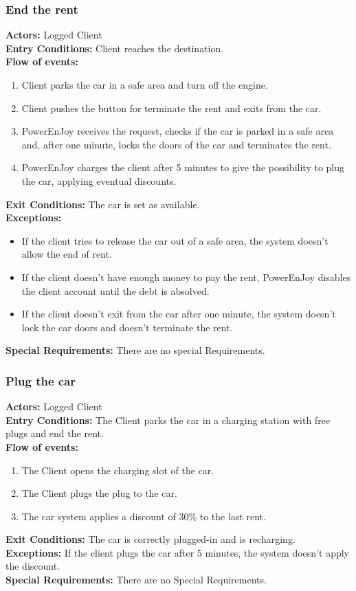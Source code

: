 \subsubsection{End the rent}
%
\textbf{Actors:}
Logged Client \\
%
\textbf{Entry Conditions:}
Client reaches the destination. \\
%
\textbf{Flow of events:}
\begin{enumerate}
\item Client parks the car in a safe area and turn off the engine.
\item Client pushes the button for terminate the rent and exits from the car.
\item PowerEnJoy receives the request, checks if the car is parked in a safe area and, after one minute, locks the doors of the car and terminates the rent.
\item PowerEnJoy charges the client after 5 minutes to give the possibility to plug the car, applying eventual discounts.
\end{enumerate}
%
\textbf{Exit Conditions:}
The car is set as available. \\
%
\textbf{Exceptions:}
\begin{itemize}
\item If the client tries to release the car out of a safe area, the system doesn't allow the end of rent.
\item If the client doesn't have enough money to pay the rent, PowerEnJoy disables the client account until the debt is absolved.
\item If the client doesn't exit from the car after one minute, the system doesn't lock the car doors and doesn't terminate the rent.
\end{itemize}
%
\textbf{Special Requirements:}
There are no special Requirements.



\subsubsection{Plug the car}
%
\textbf{Actors:}
Logged Client \\
%
\textbf{Entry Conditions:}
The Client parks the car in a charging station with free plugs and end the rent. \\
%
\textbf{Flow of events:}
\begin{enumerate}
\item The Client opens the charging slot of the car.
\item The Client plugs the plug to the car.
\item The car system applies a discount of 30\% to the last rent.
\end{enumerate}
%
\textbf{Exit Conditions:}
The car is correctly plugged-in and is recharging.\\
%
\textbf{Exceptions:}
If the client plugs the car after 5 minutes, the system doesn't apply the discount.\\
%
\textbf{Special Requirements:}
There are no Special Requirements.



